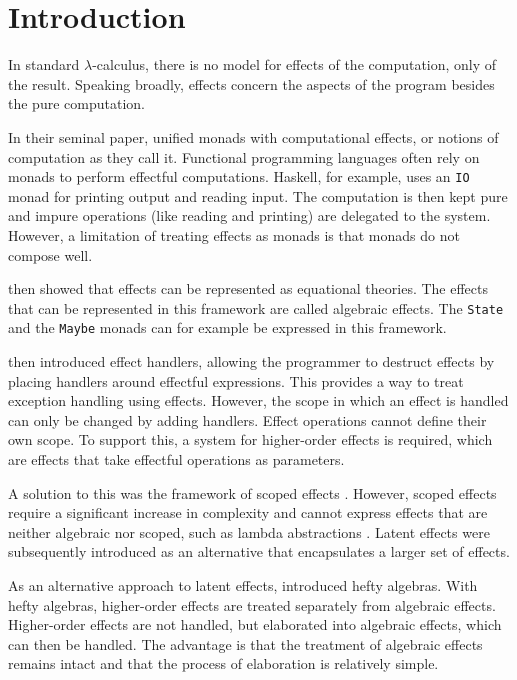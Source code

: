 \section{Introduction}

In standard $\lambda$-calculus, there is no model for effects of the computation, only of the result. Speaking broadly, effects concern the aspects of the program besides the pure computation. \cite{moggi_computational_1989}

In their seminal paper, \textcite{moggi_computational_1989} unified monads with computational effects, or notions of computation as they call it. Functional programming languages often rely on monads to perform effectful computations. Haskell, for example, uses an \texttt{IO} monad for printing output and reading input. The computation is then kept pure and impure operations (like reading and printing) are delegated to the system. However, a limitation of treating effects as monads is that monads do not compose well.

\textcite{goos_adequacy_2001} then showed that effects can be represented as equational theories. The effects that can be represented in this framework are called algebraic effects. The \texttt{State} and the \texttt{Maybe} monads can for example be expressed in this framework.

\textcite{castagna_handlers_2009} then introduced effect handlers, allowing the programmer to destruct effects by placing handlers around effectful expressions. This provides a way to treat exception handling using effects. However, the scope in which an effect is handled can only be changed by adding handlers. Effect operations cannot define their own scope. To support this, a system for higher-order effects is required, which are effects that take effectful operations as parameters.

A solution to this was the framework of scoped effects \cite{wu_effect_2014}. However, scoped effects require a significant increase in complexity and cannot express effects that are neither algebraic nor scoped, such as lambda abstractions \cite{oh_latent_2021}. Latent effects \cite{oh_latent_2021} were subsequently introduced as an alternative that encapsulates a larger set of effects.

As an alternative approach to latent effects, \textcite{bach_poulsen_hefty_2023} introduced hefty algebras. With hefty algebras, higher-order effects are treated separately from algebraic effects. Higher-order effects are not handled, but elaborated into algebraic effects, which can then be handled. The advantage is that the treatment of algebraic effects remains intact and that the process of elaboration is relatively simple.

